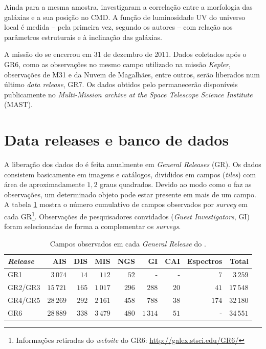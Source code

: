 Ainda para a mesma amostra, \citet{Schiminovich2007} investigaram a correlação
entre a morfologia das galáxias e a sua posição no CMD. A função de luminosidade
UV do universo local é medida -- pela primeira vez, segundo os autores -- com
relação aos parâmetros estruturais e à inclinação das galáxias.

A missão do \galex se encerrou em 31 de dezembro de 2011. Dados coletados após o
GR6, como as observações no mesmo campo utilizado na missão {\em Kepler},
observações de M31 e da Nuvem de Magalhães, entre outros, serão liberados num
último {\em data release}, GR7. Os dados obtidos pelo \galex permanecerão
disponíveis publicamente no {\em Multi-Mission archive at the Space Telescope
Science Institute} (MAST).




\section{Data releases e banco de dados}
\label{sec:Galex:BancoDeDados}

A liberação dos dados do \galex é feita anualmente em {\em General Releases}
(GR). Os dados consistem basicamente em imagens e catálogos, divididos em campos
({\em tiles}) com área de aproximadamente $1,2$ graus quadrados. Devido ao modo
como o \galex faz as observações, um determinado objeto pode estar presente em
mais de um campo. A tabela \ref{tab:GalexReleases} mostra o número cumulativo de
campos observados por {\em survey} em cada GR\footnote{Informações retiradas do
{\em website} do GR6: \url{http://galex.stsci.edu/GR6/}}. Observações de
pesquisadores convidados ({\em Guest Investigators}, GI) foram selecionadas de
forma a complementar os {\em surveys}.

\begin{table}
	\caption[Campos observados em cada {\em General Release} do \galex.]{Campos
	observados em cada {\em General Release} do \galex.}
	\begin{tabular}{l r r r r r r r r}
		{\em Release} & AIS       & DIS   & MIS      & NGS   &     GI   &  CAI & Espectros & Total     \\
		\midrule
		GR1           &  $3\,074$ &  $14$ &    $112$ &  $52$ &        - &    - &       $7$ &  $3\,259$ \\
		GR2/GR3       & $15\,721$ & $165$ & $1\,017$ & $296$ &    $288$ & $20$ &      $41$ & $17\,548$ \\
		GR4/GR5       & $28\,269$ & $292$ & $2\,161$ & $458$ &    $788$ & $38$ &     $174$ & $32\,180$ \\
		GR6           & $28\,889$ & $338$ & $3\,479$ & $480$ & $1\,314$ & $51$ &         - & $34\,551$ \\
	\end{tabular}
	\label{tab:GalexReleases}
\end{table}

